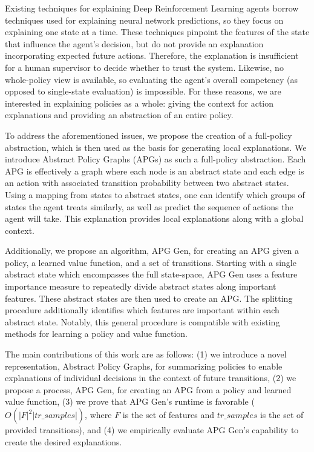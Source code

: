 \documentclass[letterpaper]{article} %
\begin{document}
Existing techniques for explaining Deep Reinforcement Learning agents borrow techniques used for explaining neural network predictions, so they focus on explaining one state at a time.
These techniques pinpoint the features of the state that influence the agent's decision, but do not provide an explanation incorporating expected future actions.
Therefore, the explanation is insufficient for a human supervisor to decide whether to trust the system.
Likewise, no whole-policy view is available, so evaluating the agent's overall competency (as opposed to single-state evaluation) is impossible.
For these reasons, we are interested in explaining policies as a whole: giving the context for action explanations and providing an abstraction of an entire policy.

To address the aforementioned issues, we propose the creation of a full-policy abstraction, which is then used as the basis for generating local explanations.
We introduce Abstract Policy Graphs (APGs) as such a full-policy abstraction.
Each APG is effectively a graph where each node is an abstract state and each edge is an action with associated transition probability between two abstract states.
Using a mapping from states to abstract states, one can identify which groups of states the agent treats similarly, as well as predict the sequence of actions the agent will take.
This explanation provides local explanations along with a global context.

Additionally, we propose an algorithm, APG Gen, for creating an APG given a policy, a learned value function, and a set of transitions.
Starting with a single abstract state which encompasses the full state-space, APG Gen uses a feature importance measure to repeatedly divide abstract states along important features.
These abstract states are then used to create an APG.
The splitting procedure additionally identifies which features are important within each abstract state.
Notably, this general procedure is compatible with existing methods for learning a policy and value function.

The main contributions of this work are as follows: (1) we introduce a novel representation, Abstract Policy Graphs, for summarizing policies to enable explanations of individual decisions in the context of future transitions, (2) we propose a process, APG Gen, for creating an APG from a policy and learned value function, (3) we prove that APG Gen's runtime is favorable ($O(|F|^2 |tr\_samples|)$, where $F$ is the set of features and $tr\_samples$ is the set of provided transitions),
and (4) we empirically evaluate APG Gen's capability to create the desired explanations.
\end{document}
